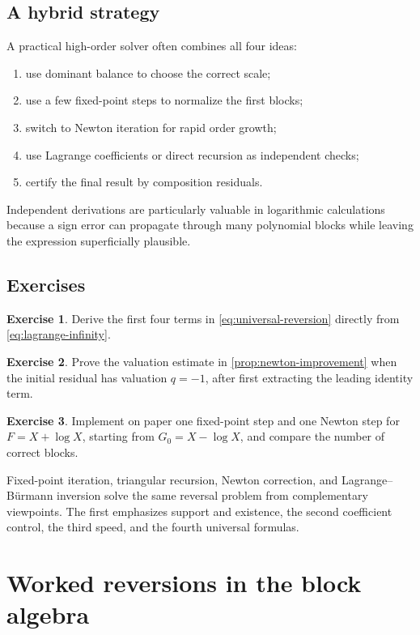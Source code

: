 \documentclass[11pt,openany]{book}
\theoremstyle{definition}
\newtheorem{exercise}{Exercise}[chapter]
\theoremstyle{plain}
\theoremstyle{remark}
\begin{document}
\section{A hybrid strategy}
A practical high-order solver often combines all four ideas:
\begin{enumerate}
\item use dominant balance to choose the correct scale;
\item use a few fixed-point steps to normalize the first blocks;
\item switch to Newton iteration for rapid order growth;
\item use Lagrange coefficients or direct recursion as independent checks;
\item certify the final result by composition residuals.
\end{enumerate}
Independent derivations are particularly valuable in logarithmic calculations because a sign error can propagate through many polynomial blocks while leaving the expression superficially plausible.

\section{Exercises}
\begin{exercise}
Derive the first four terms in \cref{eq:universal-reversion} directly from \cref{eq:lagrange-infinity}.
\end{exercise}
\begin{exercise}
Prove the valuation estimate in \cref{prop:newton-improvement} when the initial residual has valuation \(q=-1\), after first extracting the leading identity term.
\end{exercise}
\begin{exercise}
Implement on paper one fixed-point step and one Newton step for \(F=X+\log X\), starting from \(G_0=X-\log X\), and compare the number of correct blocks.
\end{exercise}

\begin{summarybox}
Fixed-point iteration, triangular recursion, Newton correction, and Lagrange--B\"urmann inversion solve the same reversal problem from complementary viewpoints. The first emphasizes support and existence, the second coefficient control, the third speed, and the fourth universal formulas.
\end{summarybox}

\chapter{Worked reversions in the block algebra}\label{ch:worked-reversions}
\end{document}
